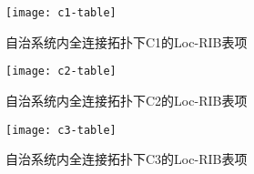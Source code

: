 
\begin{figure}
  \centering
  \texttt{[image: c1-table]}
  \caption{自治系统内全连接拓扑下C1的Loc-RIB表项}
  \label{fig:c1-table}
\end{figure}


\begin{figure}
  \centering
  \texttt{[image: c2-table]}
  \caption{自治系统内全连接拓扑下C2的Loc-RIB表项}
  \label{fig:c2-table}
\end{figure}

\begin{figure}
  \centering
  \texttt{[image: c3-table]}
  \caption{自治系统内全连接拓扑下C3的Loc-RIB表项}
  \label{fig:c3-table}
\end{figure}

